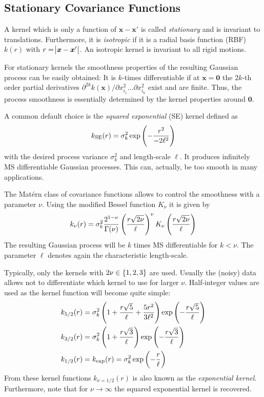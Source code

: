 \documentclass[11pt,a4paper,twoside,BCOR=15mm]{scrreprt}
\newcommand{\vc}[1]{\bm{#1}}
\newcommand{\ped}[1]{_{\mathrm{#1}}}
\newcommand{\newterm}[1]{\emph{#1}}
\begin{document}
\subsection{Stationary Covariance Functions}
A kernel which is only a function of $\vc x - \vc x'$ is called 
\newterm{stationary} and is invariant to translations. Furthermore, it is 
\newterm{isotropic} if it is a radial basis function (RBF) $k(r)$ with $r 
= \abs{\vc x - \vc x'}$.  An isotropic kernel is invariant to all rigid motions.

For stationary kernels the smoothness properties of the resulting Gaussian 
process can be easily obtained: It is $k$-times differentiable if at $\vc 
x = \vc 0$ the $2k$-th order partial derivatives $\partial^{2k} k(\vc x) 
/ \partial x_{i_1}^2 \dots \partial x_{i_k}^2$ exist and are finite. Thus, the 
process smoothness is essentially determined by the kernel properties around 
$\vc 0$.

A common default choice is the \newterm{squared exponential} (SE) kernel defined 
as
\begin{equation}
    k\ped{SE}(r) = \sigma_k^2 \exp\del{-\frac{r^2}{-2\ell^2}}
\end{equation}
with the desired process variance $\sigma_k^2$ and length-scale $\ell$. It 
produces infinitely MS differentiable Gaussian processes. This can, actually, be 
too smooth in many applications.

The Mat\'ern class of covariance functions allows to control the smoothness with 
a parameter $\nu$. Using the modified Bessel function $K_{\nu}$ it is given by
\begin{equation}
    k_{\nu}(r) = \sigma_k^2 \frac{2^{1-\nu}}{\Gamma(\nu)} 
    \del{\frac{r\sqrt{2\nu}}{\ell}}^{\nu} K_{\nu} 
    \del{\frac{r\sqrt{2\nu}}{\ell}}
\end{equation}
The resulting Gaussian process will be $k$ times MS differentiable for $k 
< \nu$. The parameter $\ell$ denotes again the characteristic length-scale.

Typically, only the kernels with $2\nu \in \cbr{1, 2, 3}$ are used.  Usually the 
(noisy) data allows not to differentiate which kernel to use for larger $\nu$.  
Half-integer values are used as the kernel function will become quite simple:
\begin{align}
    k_{5/2}(r) &= \sigma_k^2 \del{1 + \frac{r\sqrt{5}}{\ell} 
        + \frac{5r^2}{3\ell^2}} \exp\del{-\frac{r\sqrt{5}}{\ell}} \\
    k_{3/2}(r) &= \sigma_k^2 \del{1 + \frac{r\sqrt{3}}{\ell}} 
    \exp\del{-\frac{r\sqrt{3}}{\ell}} \\
    k_{1/2}(r) &= k_{\exp}(r) = \sigma_k^2 \exp\del{-\frac{r}{\ell}}
\end{align}
From these kernel functions $k_{\nu=1/2}(r)$ is also known as the 
\newterm{exponential kernel}. Furthermore, note that for $\nu \rightarrow 
\infty$ the squared exponential kernel is recovered.
\end{document}
